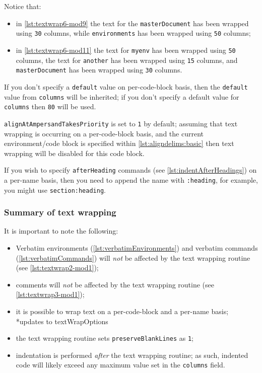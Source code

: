 	Notice that:
	\begin{itemize}
		\item in \cref{lst:textwrap6-mod9} the text for the \texttt{masterDocument} has been
		      wrapped using \texttt{30} columns, while \texttt{environments} has
		      been wrapped using \texttt{50} columns;
		\item in \cref{lst:textwrap6-mod11} the text for \texttt{myenv} has been wrapped
		      using \texttt{50} columns, the text for \texttt{another} has
		      been wrapped using \texttt{15} columns, and \texttt{masterDocument}
		      has been wrapped using \texttt{30} columns.
	\end{itemize}
	If you don't specify a \texttt{default} value on per-code-block basis, then
	the \texttt{default} value from \texttt{columns} will be inherited;
	if you don't specify a default value for \texttt{columns} then
	\texttt{80} will be used.

	\texttt{alignAtAmpersandTakesPriority} is set to \texttt{1} by default; assuming
	that text wrapping is occurring on a per-code-block basis, and the current
	environment/code block is specified within \vref{lst:aligndelims:basic} then text wrapping
	will be disabled for this code block.

	If you wish to specify \texttt{afterHeading} commands (see
	\vref{lst:indentAfterHeadings}) on a per-name basis, then you need to append the name with
	\texttt{:heading}, for example, you might use \texttt{section:heading}.

\subsubsection{Summary of text wrapping}
	It is important to note the following:
	\begin{itemize}
		\item Verbatim environments (\vref{lst:verbatimEnvironments}) and verbatim commands
		      (\vref{lst:verbatimCommands}) will \emph{not} be affected by the text
		      wrapping routine (see \vref{lst:textwrap2-mod1});
		\item comments will \emph{not} be affected by the text wrapping routine (see
		      \vref{lst:textwrap3-mod1});
		\item it is possible to wrap text on a per-code-block and a per-name basis;
		      *{updates to textWrapOptions}
		\item the text wrapping routine sets \texttt{preserveBlankLines} as
		      \texttt{1};
		\item indentation is performed \emph{after} the text wrapping routine; as such,
		      indented code will likely exceed any maximum value set in the \texttt{columns}
		      field.
	\end{itemize}

